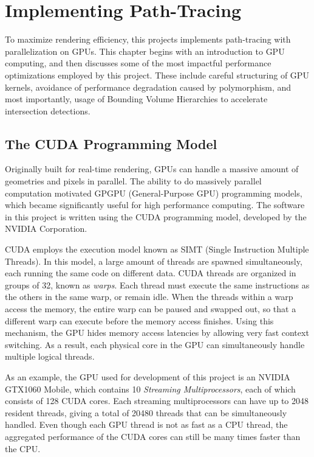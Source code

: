 \chapter{Implementing Path-Tracing}
\label{chapter implementation}

To maximize rendering efficiency, this projects implements path-tracing with parallelization on GPUs. This chapter begins with an introduction to GPU computing, and then discusses some of the most impactful performance optimizations employed by this project. These include careful structuring of GPU kernels, avoidance of performance degradation caused by polymorphism, and most importantly, usage of Bounding Volume Hierarchies to accelerate intersection detections.

\section{The CUDA Programming Model}

Originally built for real-time rendering, GPUs can handle a massive amount of geometries and pixels in parallel. The ability to do massively parallel computation motivated GPGPU (General-Purpose GPU) programming models, which became significantly useful for high performance computing. The software in this project is written using the CUDA programming model, developed by the NVIDIA Corporation.

CUDA employs the execution model known as SIMT (Single Instruction Multiple Threads). In this model, a large amount of threads are spawned simultaneously, each running the same code on different data. CUDA threads are organized in groups of 32, known as \textit{warps}. Each thread must execute the same instructions as the others in the same warp, or remain idle. When the threads within a warp access the memory, the entire warp can be paused and swapped out, so that a different warp can execute before the memory access finishes. Using this mechanism, the GPU hides memory access latencies by allowing very fast context switching. As a result, each physical core in the GPU can simultaneously handle multiple logical threads.

As an example, the GPU used for development of this project is an NVIDIA GTX1060 Mobile, which contains 10 \textit{Streaming Multiprocessors}, each of which consists of 128 CUDA cores. Each streaming multiprocessors can have up to 2048 resident threads, giving a total of 20480 threads that can be simultaneously handled. Even though each GPU thread is not as fast as a CPU thread, the aggregated performance of the CUDA cores can still be many times faster than the CPU.

